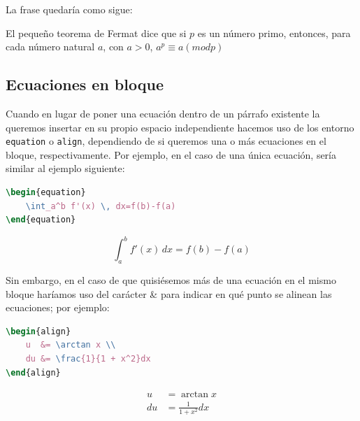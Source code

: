 \documentclass[%
    school=etsisi,%
    type=tfg,%
    degree=61CD,%
]{upm-report}
\begin{document}
La frase quedaría como sigue:

El pequeño teorema de Fermat dice que si $p$ es un número primo, entonces, para cada número natural $a$, con $a>0$, $a^p \equiv a (mod p)$

\subsection{Ecuaciones en bloque}

Cuando en lugar de poner una ecuación dentro de un párrafo existente la queremos insertar en su propio espacio independiente hacemos uso de los entorno \texttt{equation} o \texttt{align}, dependiendo de si queremos una o más ecuaciones en el bloque, respectivamente. Por ejemplo, en el caso de una única ecuación, sería similar al ejemplo siguiente:

\begin{minipage}[c]{.5\textwidth}
\begin{lstlisting}[language=tex]
\begin{equation}
	\int_a^b f'(x) \, dx=f(b)-f(a)
\end{equation}
\end{lstlisting}
\end{minipage}%
\begin{minipage}[c]{.5\textwidth}
\begin{equation}
    \int_a^b f'(x) \, dx=f(b)-f(a)
\end{equation}
\end{minipage}

Sin embargo, en el caso de que quisiésemos más de una ecuación en el mismo bloque haríamos uso del carácter \& para indicar en qué punto se alinean las ecuaciones; por ejemplo:

\begin{minipage}[c]{.5\textwidth}
\begin{lstlisting}[language=tex]
\begin{align}
    u  &= \arctan x \\ 
    du &= \frac{1}{1 + x^2}dx
\end{align}
\end{lstlisting}
\end{minipage}%
\begin{minipage}[c]{.5\textwidth}
\begin{align}
    u  &= \arctan x \\ 
    du &= \frac{1}{1 + x^2}dx
\end{align}
\end{minipage}
\end{document}
